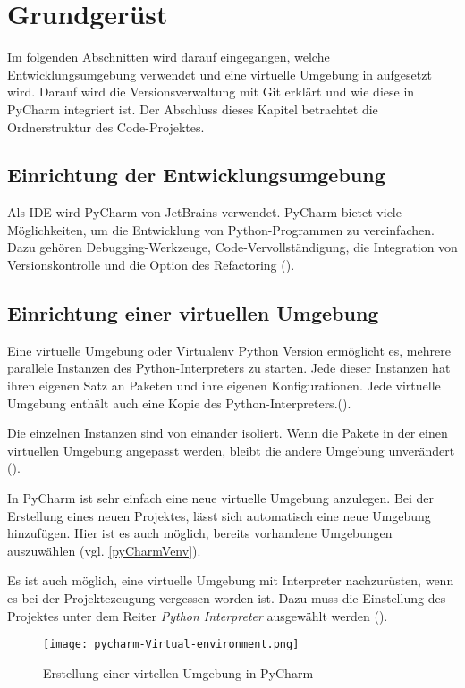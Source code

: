 
\chapter{Grundgerüst}
Im folgenden Abschnitten wird darauf eingegangen, welche Entwicklungsumgebung verwendet und eine virtuelle Umgebung in aufgesetzt wird. Darauf
wird die Versionsverwaltung mit Git erklärt und wie diese in PyCharm integriert ist. Der Abschluss dieses Kapitel
betrachtet die Ordnerstruktur des Code-Projektes.

\section{Einrichtung der Entwicklungsumgebung}
Als \acf{IDE} wird PyCharm von JetBrains verwendet. PyCharm bietet viele Möglichkeiten, um die Entwicklung
von Python-Programmen zu vereinfachen. Dazu gehören Debugging-Werkzeuge, Code-Vervollständigung, die Integration von Versionskontrolle
und die Option des Refactoring (\cite{pyCharmGettingStarted}).

\section{Einrichtung einer virtuellen Umgebung}
\glqq Eine virtuelle Umgebung oder Virtualenv Python Version ermöglicht es, mehrere parallele Instanzen
 des Python-Interpreters zu starten. Jede dieser Instanzen hat ihren 
 eigenen Satz an Paketen und ihre eigenen Konfigurationen. 
 Jede virtuelle Umgebung enthält auch eine Kopie des Python-Interpreters.\grqq (\cite{team_virtualenv_2023}).

 Die einzelnen Instanzen sind von einander isoliert. Wenn die Pakete in der einen virtuellen Umgebung angepasst werden, bleibt die andere Umgebung unverändert (\cite[S. 474]{hunt_beginners_2023}).

 In PyCharm ist sehr einfach eine neue virtuelle Umgebung anzulegen. Bei der Erstellung eines neuen Projektes, 
 lässt sich automatisch eine neue Umgebung hinzufügen. Hier ist es auch möglich, bereits vorhandene Umgebungen auszuwählen (vgl. \autoref{pyCharmVenv}).

 Es ist auch möglich, eine virtuelle Umgebung mit Interpreter nachzurüsten, wenn es bei der Projektezeugung vergessen worden ist.
 Dazu muss die Einstellung des Projektes unter dem Reiter \textit{Python Interpreter} ausgewählt werden (\cite{pyCharmVirtualEnv}).

 \begin{figure}[h]
    \centering
    \texttt{[image: pycharm-Virtual-environment.png]}
    \caption{Erstellung einer virtellen Umgebung in PyCharm}
    \label{pyCharmVenv}
    \end{figure}
\newpage
